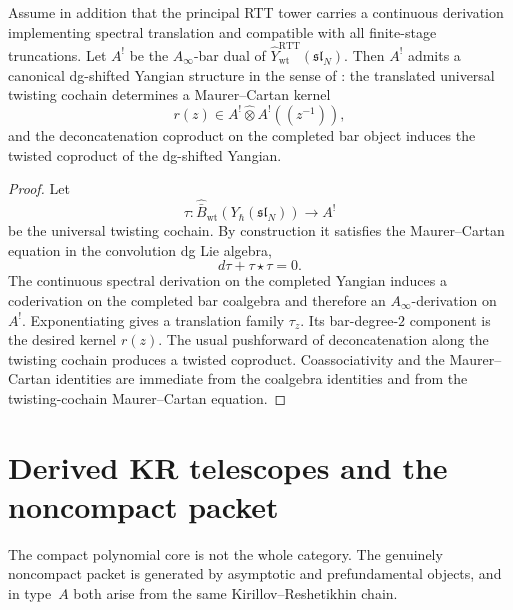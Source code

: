 \begin{theorem}
\ClaimStatusProvedHere
\label{thm:recognition-completed-dg-shifted-yangian}
Assume in addition that the principal RTT tower carries a continuous
derivation implementing spectral translation and compatible with all
finite-stage truncations.  Let $A^!$ be the $A_\infty$-bar dual of
$\widehat Y^{\mathrm{RTT}}_{\mathrm{wt}}(\mathfrak{sl}_N)$.  Then $A^!$
admits a canonical dg-shifted Yangian structure in the sense of
\cite{DNP25}: the translated universal twisting cochain determines a
Maurer--Cartan kernel
\begin{equation}
r(z)\in A^!\widehat\otimes A^!((z^{-1})),
\end{equation}
and the deconcatenation coproduct on the completed bar object induces the
twisted coproduct of the dg-shifted Yangian.
\end{theorem}

\begin{proof}
Let
\begin{equation}
\tau:\widehat{\bar B}_{\mathrm{wt}}(Y_\hbar(\mathfrak{sl}_N))\to A^!
\end{equation}
be the universal twisting cochain.  By construction it satisfies the
Maurer--Cartan equation in the convolution dg Lie algebra,
\begin{equation}
d\tau+\tau\star\tau=0.
\end{equation}
The continuous spectral derivation on the completed Yangian induces a
coderivation on the completed bar coalgebra and therefore an
$A_\infty$-derivation on $A^!$.  Exponentiating gives a translation family
$\tau_z$.  Its bar-degree-$2$ component is the desired kernel $r(z)$.  The
usual pushforward of deconcatenation along the twisting cochain produces a
twisted coproduct.  Coassociativity and the Maurer--Cartan identities are
immediate from the coalgebra identities and from the twisting-cochain
Maurer--Cartan equation.
\end{proof}

\section{Derived KR telescopes and the noncompact packet}
\label{sec:typeA-derived-KR-telescopes}

The compact polynomial core is not the whole category.  The genuinely
noncompact packet is generated by asymptotic and prefundamental objects,
and in type~$A$ both arise from the same Kirillov--Reshetikhin chain.

